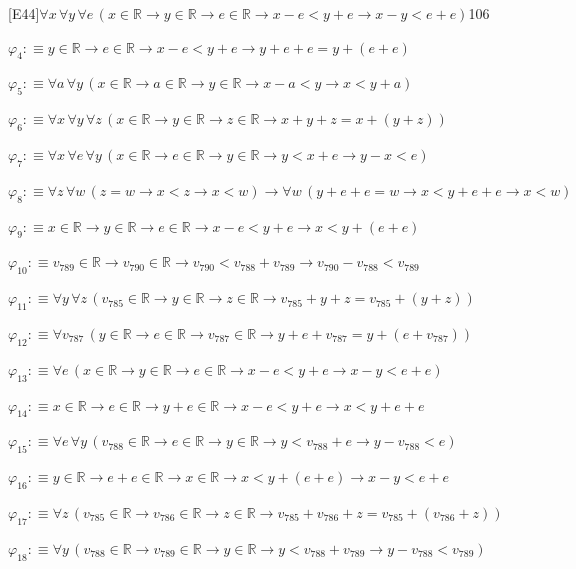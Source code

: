 \begin{fullproof}{[E44]}{$\forall x\,\forall y\,\forall e\,(x \in \mathbb{R} \to y \in \mathbb{R} \to e \in \mathbb{R} \to x - e < y + e \to x - y < e + e)$}{106}
\begin{abbrevlist}
\item $\varphi_{4} :\equiv y \in \mathbb{R} \to e \in \mathbb{R} \to x - e < y + e \to y + e + e = y + (e + e)$
\item $\varphi_{5} :\equiv \forall a\,\forall y\,(x \in \mathbb{R} \to a \in \mathbb{R} \to y \in \mathbb{R} \to x - a < y \to x < y + a)$
\item $\varphi_{6} :\equiv \forall x\,\forall y\,\forall z\,(x \in \mathbb{R} \to y \in \mathbb{R} \to z \in \mathbb{R} \to x + y + z = x + (y + z))$
\item $\varphi_{7} :\equiv \forall x\,\forall e\,\forall y\,(x \in \mathbb{R} \to e \in \mathbb{R} \to y \in \mathbb{R} \to y < x + e \to y - x < e)$
\item $\varphi_{8} :\equiv \forall z\,\forall w\,(z = w \to x < z \to x < w) \to \forall w\,(y + e + e = w \to x < y + e + e \to x < w)$
\item $\varphi_{9} :\equiv x \in \mathbb{R} \to y \in \mathbb{R} \to e \in \mathbb{R} \to x - e < y + e \to x < y + (e + e)$
\item $\varphi_{10} :\equiv v_{789} \in \mathbb{R} \to v_{790} \in \mathbb{R} \to v_{790} < v_{788} + v_{789} \to v_{790} - v_{788} < v_{789}$
\item $\varphi_{11} :\equiv \forall y\,\forall z\,(v_{785} \in \mathbb{R} \to y \in \mathbb{R} \to z \in \mathbb{R} \to v_{785} + y + z = v_{785} + (y + z))$
\item $\varphi_{12} :\equiv \forall v_{787}\,(y \in \mathbb{R} \to e \in \mathbb{R} \to v_{787} \in \mathbb{R} \to y + e + v_{787} = y + (e + v_{787}))$
\item $\varphi_{13} :\equiv \forall e\,(x \in \mathbb{R} \to y \in \mathbb{R} \to e \in \mathbb{R} \to x - e < y + e \to x - y < e + e)$
\item $\varphi_{14} :\equiv x \in \mathbb{R} \to e \in \mathbb{R} \to y + e \in \mathbb{R} \to x - e < y + e \to x < y + e + e$
\item $\varphi_{15} :\equiv \forall e\,\forall y\,(v_{788} \in \mathbb{R} \to e \in \mathbb{R} \to y \in \mathbb{R} \to y < v_{788} + e \to y - v_{788} < e)$
\item $\varphi_{16} :\equiv y \in \mathbb{R} \to e + e \in \mathbb{R} \to x \in \mathbb{R} \to x < y + (e + e) \to x - y < e + e$
\item $\varphi_{17} :\equiv \forall z\,(v_{785} \in \mathbb{R} \to v_{786} \in \mathbb{R} \to z \in \mathbb{R} \to v_{785} + v_{786} + z = v_{785} + (v_{786} + z))$
\item $\varphi_{18} :\equiv \forall y\,(v_{788} \in \mathbb{R} \to v_{789} \in \mathbb{R} \to y \in \mathbb{R} \to y < v_{788} + v_{789} \to y - v_{788} < v_{789})$

\end{abbrevlist}
\end{fullproof}
